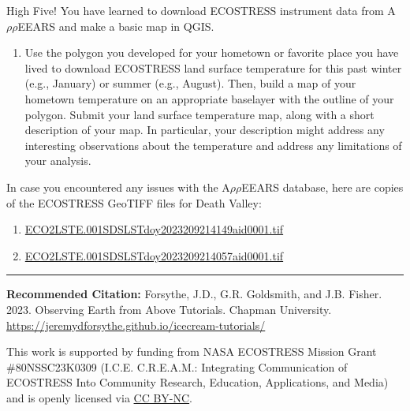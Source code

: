 \documentclass[oneside,a4paper,11pt,explicit]{book}
\begin{document}
\vspace{1em}

High Five! You have learned to download ECOSTRESS instrument data from A$\rho\rho$EEARS and make a basic map in QGIS.

\begin{tcolorbox}[colback=yellow!5!white,colframe=MACred,title= \vspace{.2em} \Large Map of the Week Assignments]
	\large
	\begin{enumerate}
  \item Use the polygon you developed for your hometown or favorite place you have lived to download ECOSTRESS land surface temperature for this past winter (e.g., January) or summer (e.g., August). Then, build a map of your hometown temperature on an appropriate baselayer with the outline of your polygon. Submit your land surface temperature map, along with a short description of your map. In particular, your description might address any interesting observations about the temperature and address any limitations of your analysis.
	\end{enumerate}
\end{tcolorbox}

\begin{tcolorbox}[colback=yellow!5!white,title=\textbf{Datafiles}]
	\large
	In case you encountered any issues with the A$\rho\rho$EEARS database, here are copies of the ECOSTRESS GeoTIFF files for Death Valley:
	\begin{enumerate}
		\item \href{https://jeremydforsythe.github.io/icecream-tutorials/Tutorial5_AccessingRemoteSensingDataWithAppears/ECO2LSTE.001_SDS_LST_doy2023209214149_aid0001.tif}{\small ECO2LSTE.001\textunderscore SDS\textunderscore LST\textunderscore doy2023209214149\textunderscore aid0001.tif}
		\item \href{https://jeremydforsythe.github.io/icecream-tutorials/Tutorial5_AccessingRemoteSensingDataWithAppears/ECO2LSTE.001_SDS_LST_doy2023209214057_aid0001.tif}{\small ECO2LSTE.001\textunderscore SDS\textunderscore LST\textunderscore doy2023209214057\textunderscore aid0001.tif}
	\end{enumerate}
\end{tcolorbox}


\hrule

\vspace{1em}

\small \textbf{Recommended Citation:} Forsythe, J.D., G.R. Goldsmith, and J.B. Fisher. 2023. Observing Earth from Above Tutorials. Chapman University. \url{https://jeremydforsythe.github.io/icecream-tutorials/}

\vspace{1em}

This work is supported by funding from NASA ECOSTRESS Mission Grant \#80NSSC23K0309 (I.C.E. C.R.E.A.M.: Integrating Communication of ECOSTRESS Into Community Research, Education, Applications, and Media) and is openly licensed via \href{https://creativecommons.org/licenses/by-nc/4.0/}{CC BY-NC}.
\end{document}

